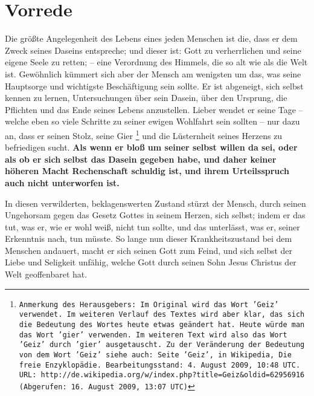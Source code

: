 \chapter{Vorrede}

Die größte Angelegenheit des Lebens eines jeden Menschen ist die, dass er dem
Zweck seines Daseins entspreche; und dieser ist: Gott zu verherrlichen und seine
eigene Seele zu retten; -- eine Verordnung des Himmels, die so alt wie als die
Welt ist. Gewöhnlich kümmert sich aber der Mensch am wenigsten um das, was seine
Hauptsorge und wichtigste Beschäftigung sein sollte. Er ist abgeneigt, sich
selbst kennen zu lernen, Untersuchungen über sein Dasein, über den Ursprung, die
Pflichten und das Ende seines Lebens anzustellen. Lieber wendet er seine Tage
-- welche eben so viele Schritte zu seiner ewigen Wohlfahrt sein sollten -- nur
dazu an, dass er seinen Stolz, seine Gier
\footnote{\texttt{Anmerkung des Herausgebers:
Im Original wird das Wort 'Geiz' verwendet. Im weiteren Verlauf des
Textes wird aber klar, das sich die Bedeutung des Wortes heute etwas geändert
hat. Heute würde man das Wort 'gier' verwenden. Im weiteren Text wird also das
Wort 'Geiz' durch 'gier' ausgetauscht. Zu der Veränderung der Bedeutung von
dem Wort 'Geiz' siehe auch: Seite 'Geiz', in Wikipedia, Die freie
Enzyklopädie. Bearbeitungsstand: 4. August 2009, 10:48 UTC. URL:
http://de.wikipedia.org/w/index.php?title=Geiz\&oldid=62956916 (Abgerufen: 16.
August 2009, 13:07 UTC)}} und die Lüsternheit seines Herzens zu befriedigen
sucht. \textbf{Als wenn er bloß um seiner selbst willen da sei, oder als ob er
sich selbst das Dasein gegeben habe, und daher keiner höheren Macht Rechenschaft
schuldig ist, und ihrem Urteilsspruch auch nicht unterworfen ist.}

\medskip

In diesen verwilderten, beklagenswerten Zustand stürzt der Mensch, durch seinen
Ungehorsam gegen das Gesetz Gottes in seinem Herzen, sich selbst; indem er das
tut, was er, wie er wohl weiß, nicht tun sollte, und das unterlässt, was er,
seiner Erkenntnis nach, tun müsste. So lange nun dieser Krankheitszustand bei
dem Menschen andauert, macht er sich seinen Gott zum Feind, und sich selbst der
Liebe und Seligkeit unfähig, welche Gott durch seinen Sohn Jesus Christus der
Welt geoffenbaret hat.

\medskip

